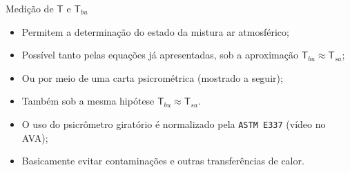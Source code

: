     \begin{frame}\vspace*{-0em}
    \end{frame}

    \begin{frame}{Medição de $\mathsf{T}$ e $\mathsf{T}_{bu}$}\vspace*{-0em}
        \begin{itemize}
            \item<1-> Permitem a \alert{determinação do estado} da mistura \alert{ar
                atmosférico};
                \\[\medskipamount]
            \item<2-> Possível tanto pelas equações já apresentadas, sob a \alert{aproximação
                $\mathsf{T}_{bu} \approx \mathsf{T}_{sa}$};
                \\[\medskipamount]
            \item<3-> Ou por meio de uma \alert{carta psicrométrica} (mostrado a seguir);
                \\[\medskipamount]
            \item<4-> Também sob a \alert{mesma hipótese $\mathsf{T}_{bu} \approx
                \mathsf{T}_{sa}$}.
                \\[\medskipamount]
            \item<5-> O uso do psicrômetro giratório é normalizado pela \texttt{ASTM E337}
                (vídeo no AVA);
                \\[\medskipamount]
            \item<6-> Basicamente evitar \alert{contaminações} e \alert{outras transferências de
                calor}.
        \end{itemize}
    \end{frame}

